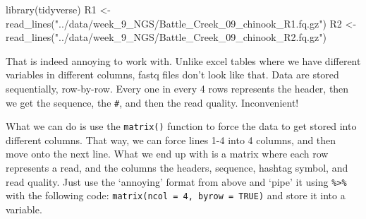 \documentclass[
  letterpaper,
  DIV=11,
  numbers=noendperiod]{scrreprt}
\newenvironment{Shaded}{}{}
\newcommand{\FunctionTok}[1]{\textcolor[rgb]{0.44,0.26,0.76}{#1}}
\newcommand{\NormalTok}[1]{\textcolor[rgb]{0.14,0.16,0.18}{#1}}
\newcommand{\OtherTok}[1]{\textcolor[rgb]{0.44,0.26,0.76}{#1}}
\newcommand{\StringTok}[1]{\textcolor[rgb]{0.01,0.18,0.38}{#1}}
\begin{document}
\begin{tcolorbox}[enhanced jigsaw, arc=.35mm, left=2mm, titlerule=0mm, rightrule=.15mm, colframe=quarto-callout-tip-color-frame, coltitle=black, colback=white, opacityback=0, bottomtitle=1mm, bottomrule=.15mm, colbacktitle=quarto-callout-tip-color!10!white, breakable, title=\textcolor{quarto-callout-tip-color}{\faLightbulb}\hspace{0.5em}{Code and answer}, toptitle=1mm, toprule=.15mm, opacitybacktitle=0.6, leftrule=.75mm]

\begin{Shaded}
\begin{Highlighting}[]
\FunctionTok{library}\NormalTok{(tidyverse)}
\NormalTok{R1 }\OtherTok{\textless{}{-}} \FunctionTok{read\_lines}\NormalTok{(}\StringTok{"../data/week\_9\_NGS/Battle\_Creek\_09\_chinook\_R1.fq.gz"}\NormalTok{)}
\NormalTok{R2 }\OtherTok{\textless{}{-}} \FunctionTok{read\_lines}\NormalTok{(}\StringTok{"../data/week\_9\_NGS/Battle\_Creek\_09\_chinook\_R2.fq.gz"}\NormalTok{)}
\end{Highlighting}
\end{Shaded}

That is indeed annoying to work with. Unlike excel tables where we have
different variables in different columns, fastq files don't look like
that. Data are stored sequentially, row-by-row. Every one in every 4
rows represents the header, then we get the sequence, the \texttt{\#},
and then the read quality. Inconvenient!

\end{tcolorbox}

What we can do is use the \texttt{matrix()} function to force the data
to get stored into different columns. That way, we can force lines 1-4
into 4 columns, and then move onto the next line. What we end up with is
a matrix where each row represents a read, and the columns the headers,
sequence, hashtag symbol, and read quality. Just use the `annoying'
format from above and `pipe' it using \texttt{\%\textgreater{}\%} with
the following code: \texttt{matrix(ncol\ =\ 4,\ byrow\ =\ TRUE)} and
store it into a variable.
\end{document}
